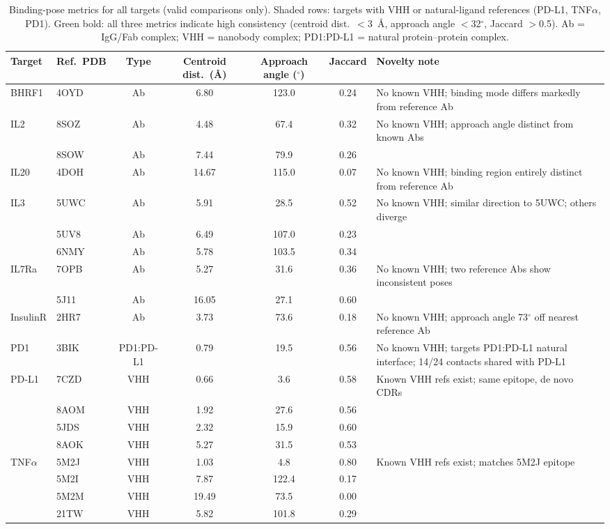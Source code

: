 \documentclass[11pt]{article}
\begin{document}
\begin{table}[!htbp]
\centering
{\small\setlength{\tabcolsep}{3pt}\begin{tabular}{llccccp{3.0cm}}
\toprule
Target & Ref.\ PDB & Type & Centroid dist.\ (\AA{}) & Approach angle ($^{\circ}$) & Jaccard & Novelty note\\
\midrule
BHRF1    & 4OYD & Ab         & 6.80 & 123.0 & 0.24 & No known VHH; binding mode differs markedly from reference Ab\\
IL2      & 8SOZ & Ab         & 4.48 & 67.4  & 0.32 & No known VHH; approach angle distinct from known Abs\\
         & 8SOW & Ab         & 7.44 & 79.9  & 0.26 & \\
IL20     & 4DOH & Ab         & 14.67 & 115.0 & 0.07 & No known VHH; binding region entirely distinct from reference Ab\\
IL3      & 5UWC & Ab         & 5.91 & 28.5  & 0.52 & No known VHH; similar direction to 5UWC; others diverge\\
         & 5UV8 & Ab         & 6.49 & 107.0 & 0.23 & \\
         & 6NMY & Ab         & 5.78 & 103.5 & 0.34 & \\
IL7Ra    & 7OPB & Ab         & 5.27 & 31.6  & 0.36 & No known VHH; two reference Abs show inconsistent poses\\
         & 5J11 & Ab         & 16.05 & 27.1 & 0.60 & \\
InsulinR & 2HR7 & Ab         & 3.73 & 73.6  & 0.18 & No known VHH; approach angle 73$^{\circ}$ off nearest reference Ab\\
PD1      & 3BIK & PD1:PD-L1  & 0.79 & 19.5  & 0.56 & No known VHH; targets PD1:PD-L1 natural interface; 14/24 contacts shared with PD-L1\\
PD-L1    & 7CZD & VHH        & 0.66 & 3.6   & 0.58 & Known VHH refs exist; same epitope, de novo CDRs\\
         & 8AOM & VHH        & 1.92 & 27.6  & 0.56 & \\
         & 5JDS & VHH        & 2.32 & 15.9  & 0.60 & \\
         & 8AOK & VHH        & 5.27 & 31.5  & 0.53 & \\
TNF$\alpha$ & 5M2J & VHH      & 1.03 & 4.8   & 0.80 & Known VHH refs exist; matches 5M2J epitope\\
         & 5M2I & VHH        & 7.87 & 122.4 & 0.17 & \\
         & 5M2M & VHH        & 19.49 & 73.5 & 0.00 & \\
         & 21TW & VHH        & 5.82 & 101.8 & 0.29 & \\
\bottomrule
\end{tabular}}
\caption{Binding-pose metrics for all targets (valid comparisons only). Shaded rows: targets with
VHH or natural-ligand references (PD-L1, TNF$\alpha$, PD1). Green bold: all three metrics indicate
high consistency (centroid dist.\ $<$3~\AA{}, approach angle $<$32$^{\circ}$, Jaccard $>$0.5). Ab = IgG/Fab complex;
VHH = nanobody complex; PD1:PD-L1 = natural protein--protein complex.}
\label{tab:pose}
\end{table}
\end{document}
